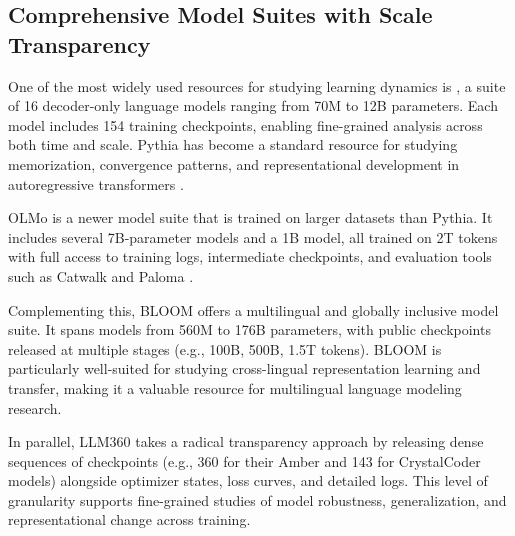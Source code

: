 
\subsection{Comprehensive Model Suites with Scale Transparency}

One of the most widely used resources for studying learning dynamics is  \citep{biderman2023pythia}, a suite of 16 decoder-only language models ranging from 70M to 12B parameters. Each model includes 154 training checkpoints, enabling fine-grained analysis across both time and scale. Pythia has become a standard resource for studying memorization, convergence patterns, and representational development in autoregressive transformers \citep{lesci2024causal,godey2024anisotropy,belrose2023eliciting}.

OLMo \citep{groeneveld2024olmo} is a newer model suite that is trained on larger datasets than Pythia. It includes several 7B-parameter models and a 1B model, all trained on 2T tokens with full access to training logs, intermediate checkpoints, and evaluation tools such as Catwalk \citep{groeneveld2023catwalk} and Paloma \citep{magnusson2024paloma}.

Complementing this, BLOOM \citep{le2023bloom} offers a multilingual and globally inclusive model suite. It spans models from 560M to 176B parameters, with public checkpoints released at multiple stages (e.g., 100B, 500B, 1.5T tokens). BLOOM is particularly well-suited for studying cross-lingual representation learning and transfer, making it a valuable resource for multilingual language modeling research.

In parallel, LLM360 \citep{liu2023llm360} takes a radical transparency approach by releasing dense sequences of checkpoints (e.g., 360 for their Amber and 143 for CrystalCoder models) alongside optimizer states, loss curves, and detailed logs. This level of granularity supports fine-grained studies of model robustness, generalization, and representational change across training.

